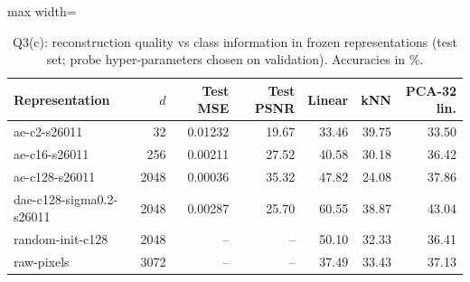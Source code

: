 \begin{table}[t]\centering\footnotesize\setlength{\tabcolsep}{3pt}
\begin{adjustbox}{max width=\textwidth}
\begin{tabular}{lrrrrrr}\toprule
Representation & $d$ & Test MSE & Test PSNR & Linear & kNN & PCA-32 lin. \\\midrule
ae-c2-s26011 & 32 & 0.01232 & 19.67 & 33.46 & 39.75 & 33.50 \\
ae-c16-s26011 & 256 & 0.00211 & 27.52 & 40.58 & 30.18 & 36.42 \\
ae-c128-s26011 & 2048 & 0.00036 & 35.32 & 47.82 & 24.08 & 37.86 \\
dae-c128-sigma0.2-s26011 & 2048 & 0.00287 & 25.70 & 60.55 & 38.87 & 43.04 \\
random-init-c128 & 2048 & -- & -- & 50.10 & 32.33 & 36.41 \\
raw-pixels & 3072 & -- & -- & 37.49 & 33.43 & 37.13 \\
\bottomrule\end{tabular}
\end{adjustbox}
\caption{Q3(c): reconstruction quality vs class information in frozen representations (test set; probe hyper-parameters chosen on validation). Accuracies in \%.}\label{tab:q3c}\end{table}
